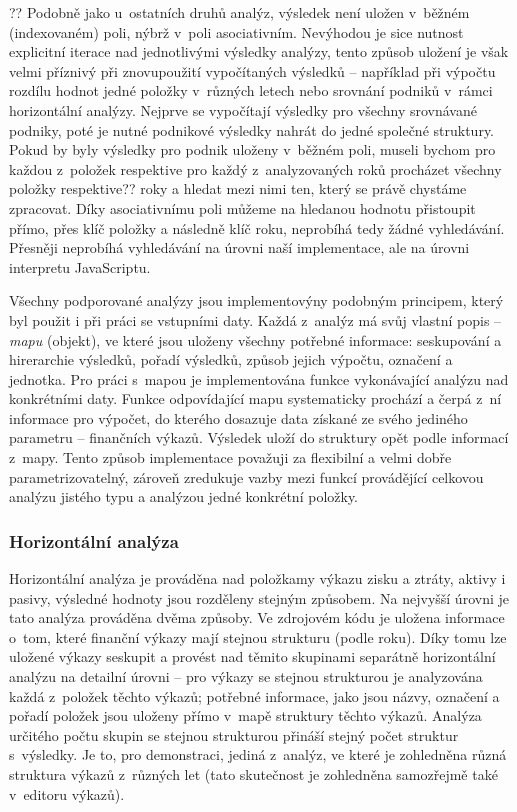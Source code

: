 ??
Podobně jako u~ostatních druhů analýz, výsledek není uložen v~běžném (indexovaném) poli, nýbrž v~poli asociativním. Nevýhodou je sice nutnost explicitní iterace nad jednotlivými výsledky analýzy, tento způsob uložení je však velmi příznivý při znovupoužití vypočítaných výsledků -- například při výpočtu rozdílu hodnot jedné položky v~různých letech nebo srovnání podniků v~rámci horizontální analýzy. Nejprve se vypočítají výsledky pro všechny srovnávané podniky, poté je nutné podnikové výsledky nahrát do jedné společné struktury. Pokud by byly výsledky pro podnik uloženy v~běžném poli, museli bychom pro každou z~položek respektive pro každý z~analyzovaných roků procházet všechny položky respektive?? roky a hledat mezi nimi ten, který se právě chystáme zpracovat. Díky asociativnímu poli můžeme na hledanou hodnotu přistoupit přímo, přes klíč položky a následně klíč roku, neprobíhá tedy žádné vyhledávání. Přesněji neprobíhá vyhledávání na úrovni naší implementace, ale na úrovni interpretu JavaScriptu.


Všechny podporované analýzy jsou implementovýny podobným principem, který byl použit i při práci se vstupními daty. Každá z~analýz má svůj vlastní popis -- \textit{mapu} (objekt), ve které jsou uloženy všechny potřebné informace: seskupování a hirerarchie výsledků, pořadí výsledků, způsob jejich výpočtu, označení a jednotka. Pro práci s~mapou je implementována funkce vykonávající analýzu nad konkrétními daty. Funkce odpovídající mapu systematicky prochází a čerpá z~ní informace pro výpočet, do kterého dosazuje data získané ze svého jediného parametru -- finančních výkazů. Výsledek uloží do struktury opět podle informací z~mapy. Tento způsob implementace považuji za flexibilní a velmi dobře parametrizovatelný, zároveň zredukuje vazby mezi funkcí provádějící celkovou analýzu jistého typu a analýzou jedné konkrétní položky.

\subsubsection{Horizontální analýza}
Horizontální analýza je prováděna nad položkamy výkazu zisku a ztráty, aktivy i pasivy, výsledné hodnoty jsou rozděleny stejným způsobem. Na nejvyšší úrovni je tato analýza prováděna dvěma způsoby. Ve zdrojovém kódu je uložena informace o~tom, které finanční výkazy mají stejnou strukturu (podle roku). Díky tomu lze uložené výkazy seskupit a provést nad těmito skupinami separátně horizontální analýzu na detailní úrovni -- pro výkazy se stejnou strukturou je analyzována každá z~položek těchto výkazů; potřebné informace, jako jsou názvy, označení a pořadí položek jsou uloženy přímo v~mapě struktury těchto výkazů. Analýza určitého počtu skupin se stejnou strukturou přináší stejný počet struktur s~výsledky. Je to, pro demonstraci, jediná z~analýz, ve které je zohledněna různá struktura výkazů z~různých let (tato skutečnost je zohledněna samozřejmě také v~editoru výkazů).

